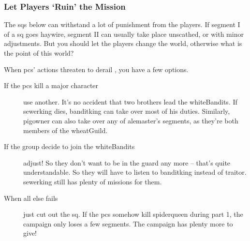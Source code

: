 \begin{multicols}{2}
\subsubsection{Let Players `Ruin' the Mission}

The \glspl{sq} below can withstand a lot of punishment from the players.
If \gls{segment} I of a \gls{sq} goes haywire, \gls{segment} II can usually take place unscathed, or with minor adjustments.
But you should let the players change the world, otherwise what is the point of this world?

When \glspl{pc}' actions threaten to derail , you have a few options.

\begin{description}
  \item[If the \glspl{pc} kill a major character]
  use another.
  It's no accident that two brothers lead the \gls{whiteBandits}.
  If \gls{sewerking} dies, \gls{banditking} can take over most of his duties.
  Similarly, \gls{pigowner} can also take over any of \gls{alemaster}'s \glspl{segment}, as they're both members of the \gls{wheatGuild}.
  \item[If the group decide to join the \gls{whiteBandits}]
  adjust!
  So they don't want to be in the \gls{guard} any more -- that's quite understandable.
  So they will have to listen to \gls{banditking} instead of \gls{traitor}.
  \Gls{sewerking} still has plenty of missions for them.
  \item[When all else fails]
  just cut out the \gls{sq}.
  If the \glspl{pc} somehow kill \gls{spiderqueen} during part 1, the campaign only loses a few \glspl{segment}.
  The campaign has plenty more to give!
\end{description}

\renewcommand\csComments{
  \mapCircle{16}{76}{1.7}{Dyson_Logos/bandit_camp}
  \mapCircle{35}{88}{2}{Dyson_Logos/forgotten_city}
  \mapCircle{27}{09}{2}{Dyson_Logos/qualme_temple}
  \mapCircle[4]{56}{52}{2.5}{Dyson_Logos/town}
  \mapCircle{44}{41}{2}{Dyson_Logos/redfall}
  \mapCircle{83}{09}{1.7}{Dyson_Logos/shadow_gate}
  \mapCircle{86}{45}{1.7}{Dyson_Logos/lakeside}
  \draw[very thick,white] (11,0.6) -- (12,0.6) node[anchor=north]{\outline{10 Miles}} -- (13,0.6) ;
}



\end{multicols}

